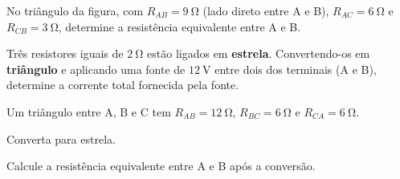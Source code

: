 \blocoaplicacao
\begin{questao}[2]{}

No triângulo da figura, com $R_{AB}=\SI{9}{\ohm}$ (lado direto entre A e B),
$R_{AC}=\SI{6}{\ohm}$ e $R_{CB}=\SI{3}{\ohm}$, determine a resistência
equivalente entre A e B.




\end{questao}
\begin{questao}[2]{}

Três resistores iguais de $\SI{2}{\ohm}$ estão ligados em \textbf{estrela}.
Convertendo-os em \textbf{triângulo} e aplicando uma fonte de $\SI{12}{\volt}$
entre dois dos terminais (A e B), determine a corrente total fornecida pela fonte.


\end{questao}
\begin{questao}[2]{}

Um triângulo entre A, B e C tem $R_{AB}=\SI{12}{\ohm}$, $R_{BC}=\SI{6}{\ohm}$ e
$R_{CA}=\SI{6}{\ohm}$.
\begin{itensq}
\item Converta para estrela.
\item Calcule a resistência equivalente entre A e B após a conversão.
\end{itensq}


\end{questao}

